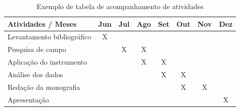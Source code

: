 \begin{table}[htb]
\centering
\caption{Exemplo de tabela de acompanhamento de atividades}
\begin{tabular}{|l|c|c|c|c|c|c|c|}
\hline
\textbf{Atividades / Meses} & \textbf{Jun} & \textbf{Jul} & \textbf{Ago} & \textbf{Set} & \textbf{Out} & \textbf{Nov} & \textbf{Dez} \\ \hline
Levantamento bibliográfico & X & & & & & & \\ \hline
Pesquisa de campo & & X & X & & & & \\ \hline
Aplicação do instrumento & & & X & X & & & \\ \hline
Análise dos dados & & & & X & X & & \\ \hline
Redação da monografia & & & & & X & X & \\ \hline
Apresentação & & & & & & & X \\ \hline
\end{tabular}
\end{table}
